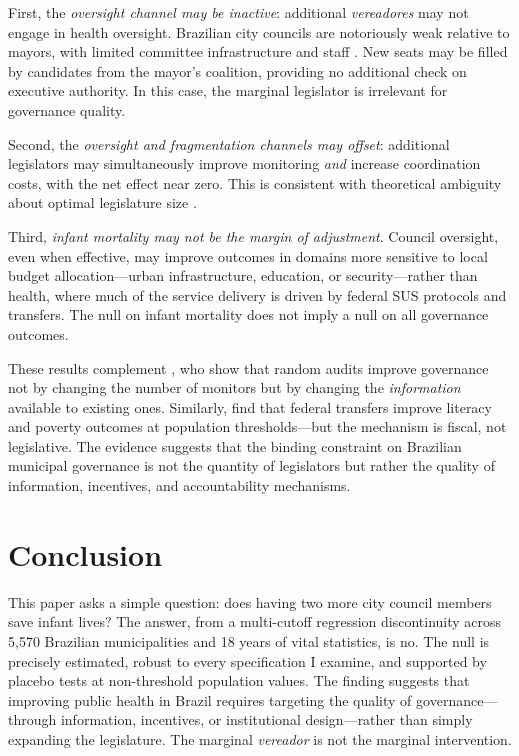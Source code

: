 \documentclass[12pt]{article}
\begin{document}
First, the \textit{oversight channel may be inactive}: additional \textit{vereadores} may not engage in health oversight. Brazilian city councils are notoriously weak relative to mayors, with limited committee infrastructure and staff \citep{lopez2010instituicoes}. New seats may be filled by candidates from the mayor's coalition, providing no additional check on executive authority. In this case, the marginal legislator is irrelevant for governance quality.

Second, the \textit{oversight and fragmentation channels may offset}: additional legislators may simultaneously improve monitoring \textit{and} increase coordination costs, with the net effect near zero. This is consistent with theoretical ambiguity about optimal legislature size \citep{stigler1976sizes, mueller2003public}.

Third, \textit{infant mortality may not be the margin of adjustment}. Council oversight, even when effective, may improve outcomes in domains more sensitive to local budget allocation---urban infrastructure, education, or security---rather than health, where much of the service delivery is driven by federal SUS protocols and transfers. The null on infant mortality does not imply a null on all governance outcomes.

These results complement \citet{ferraz2008exposing}, who show that random audits improve governance not by changing the number of monitors but by changing the \textit{information} available to existing ones. Similarly, \citet{litschig2012impact} find that federal transfers improve literacy and poverty outcomes at population thresholds---but the mechanism is fiscal, not legislative. The evidence suggests that the binding constraint on Brazilian municipal governance is not the quantity of legislators but rather the quality of information, incentives, and accountability mechanisms.


\section{Conclusion}

This paper asks a simple question: does having two more city council members save infant lives? The answer, from a multi-cutoff regression discontinuity across 5,570 Brazilian municipalities and 18 years of vital statistics, is no. The null is precisely estimated, robust to every specification I examine, and supported by placebo tests at non-threshold population values. The finding suggests that improving public health in Brazil requires targeting the quality of governance---through information, incentives, or institutional design---rather than simply expanding the legislature. The marginal \textit{vereador} is not the marginal intervention.
\end{document}
